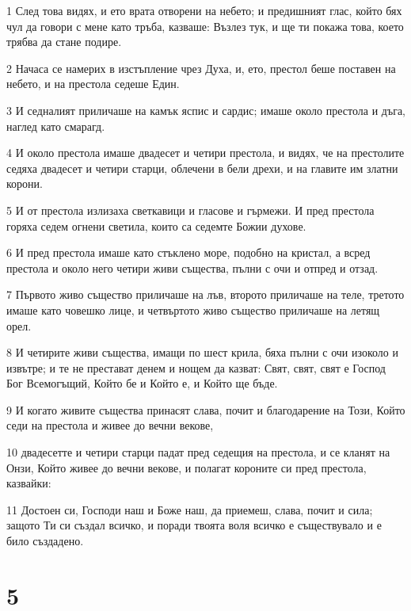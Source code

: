 \par 1 След това видях, и ето врата отворени на небето; и предишният глас, който бях чул да говори с мене като тръба, казваше: Възлез тук, и ще ти покажа това, което трябва да стане подире.
\par 2 Начаса се намерих в изстъпление чрез Духа, и, ето, престол беше поставен на небето, и на престола седеше Един.
\par 3 И седналият приличаше на камък яспис и сардис; имаше около престола и дъга, наглед като смарагд.
\par 4 И около престола имаше двадесет и четири престола, и видях, че на престолите седяха двадесет и четири старци, облечени в бели дрехи, и на главите им златни корони.
\par 5 И от престола излизаха светкавици и гласове и гърмежи. И пред престола горяха седем огнени светила, които са седемте Божии духове.
\par 6 И пред престола имаше като стъклено море, подобно на кристал, а всред престола и около него четири живи същества, пълни с очи и отпред и отзад.
\par 7 Първото живо същество приличаше на лъв, второто приличаше на теле, третото имаше като човешко лице, и четвъртото живо същество приличаше на летящ орел.
\par 8 И четирите живи същества, имащи по шест крила, бяха пълни с очи изоколо и извътре; и те не престават денем и нощем да казват: Свят, свят, свят е Господ Бог Всемогъщий, Който бе и Който е, и Който ще бъде.
\par 9 И когато живите същества принасят слава, почит и благодарение на Този, Който седи на престола и живее до вечни векове,
\par 10 двадесетте и четири старци падат пред седещия на престола, и се кланят на Онзи, Който живее до вечни векове, и полагат короните си пред престола, казвайки:
\par 11 Достоен си, Господи наш и Боже наш, да приемеш, слава, почит и сила; защото Ти си създал всичко, и поради твоята воля всичко е съществувало и е било създадено.

\chapter{5}

